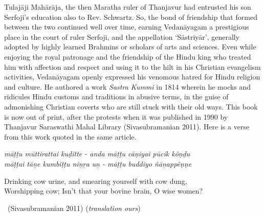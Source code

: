 Tulajāji Mahārāja, the then Maratha ruler of Thanjavur had entrusted his son Serfoji's education also to Rev. Schwartz. So, the bond of friendship that formed between the two continued well over time, earning Vedanāyagam a prestigious place in the court of ruler Serfoji, and the appellation `Sāstriyār', generally adopted by highly learned Brahmins or scholars of arts and sciences. Even while enjoying the royal patronage and the friendship of the Hindu king who treated him with affection and respect and using it to the hilt in his Christian evangelism activities, Vedanāyagam openly expressed his venomous hatred for Hindu religion and culture. He authored a work \textit{Sastra Kummi} in 1814 wherein he mocks and ridicules Hindu customs and traditions in abusive terms, in the guise of admonishing Christian coverts who are still stuck with their old ways. This book is now out of print, after the protests when it was published in 1990 by Thanjavur Saraswathi Mahal Library (Sivasubramanian 2011). Here is a verse from this work quoted in the same article.

\begin{longquote}
\textit{māṭ­ṭ­u mūttirattai kuḍitte - anda māṭ­ṭ­u cāṇiyai pūcik kôṇḍu\\ māṭ­ṭ­ai tāṉe kumbiṭ­ṭ­u niṉṟa uṉ - māṭ­ṭ­u buddiyo ñāṉappêṇṇe}
\end{longquote}

\begin{myquote}
\end{myquote}

\begin{myquote}
Drinking cow urine, and smearing yourself with cow dung,\\ Worshipping cow; Isn't that your bovine brain, O wise women? 

~\hfill (Sivasubramanian 2011) (\textit{translation ours})
\end{myquote}

\newpage

